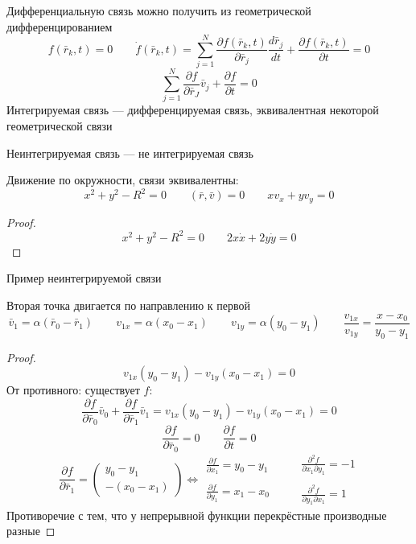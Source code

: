 \documentclass[crop=false]{standalone}
\begin{document}
\noindent \keypoint Дифференциальную связь можно получить из геометрической дифференцированием \[f(\bar r_k , t) = 0 \qquad \dot f(\bar r_k , t) = \sum^N_{j=1} \frac{\partial f(\bar r_k, t)}{\partial \bar r_j} \frac{d \bar r_j}{dt} + \frac{\partial f(\bar r_k, t)}{\partial t} = 0\]
\[\sum^N_{j=1} \frac{\partial f}{\partial \bar r_J} \bar v_j + \frac{\partial f}{\partial t} = 0 \]
\Def Интегрируемая связь — дифференцируемая связь, эквивалентная некоторой геометрической связи

\Def Неинтегрируемая связь — не интегрируемая связь

\noindent \keypoint Движение по окружности, связи эквивалентны:
\[ x^2 + y^2 - R^2 = 0 \qquad (\bar r , \bar v) = 0 \qquad xv_x + y v_y = 0\]

\begin{proof}
    \[x^2 + y^2 - R^2 = 0 \qquad 2 x \dot x + 2 y \dot y = 0\]
\end{proof}
\noindent \keypoint Пример неинтегрируемой связи

Вторая точка двигается по направлению к первой
\[\bar v_1 = \alpha (\bar r_0 - \bar r_1) \qquad v_{1x} = \alpha (x_0 - x_1) \qquad v_{1y} = \alpha(y_0 - y_1) \qquad \frac{v_{1x}}{v_{1y}} = \frac{x - x_0}{y_0 - y_1}\]
\begin{proof}
    \[v_{1x} (y_0 - y_1) - v_{1y}(x_0 - x_1) = 0\]
    От противного:
    существует $f$:
    \[\frac{\partial f}{\partial \bar r_0} \bar v_0 + \frac{\partial f}{\partial \bar r_1} \bar v_1 = v_{1x} (y_0 -y_1) - v_{1y}(x_0 -x_1) = 0\]
    \[\frac{\partial f}{\partial \bar r_0} = 0 \qquad \frac{\partial f}{\partial t} = 0\]
    \[\frac{\partial f}{\partial \bar r_1} = \begin{pmatrix}
        y_0 - y_1 \\ -(x_0 - x_1)
    \end{pmatrix} \iff \begin{matrix}
        \frac{\partial f}{\partial x_1} = y_0 - y_1 \\ \\ \frac{\partial f}{\partial y_1} = x_1 - x_0
    \end{matrix} \qquad \begin{matrix} \frac{\partial^2 f}{\partial x_1 \partial y_1} = -1 \\ \\  \frac{\partial^2 f}{\partial y_1 \partial x_1} = 1 \end{matrix}
    \]
    Противоречие с тем, что у непрерывной функции перекрёстные производные разные
\end{proof}
\end{document}
